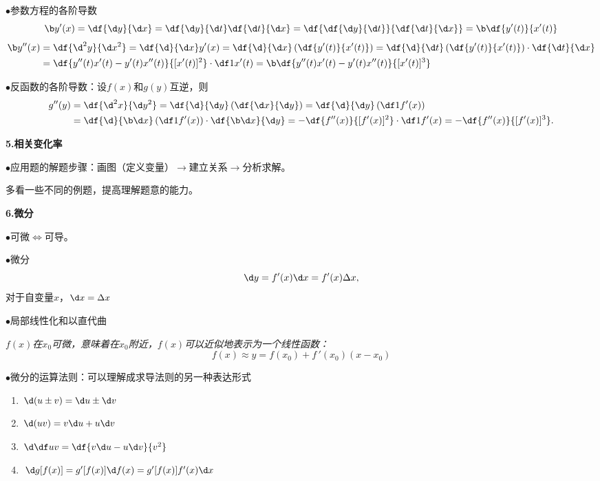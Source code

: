$\bullet$参数方程的各阶导数
$${\b y'(x)}=\df{\d y}{\d x}=\df{\d y}{\d t}\df{\d t}{\d x}
=\df{\df{\d y}{\d t}}{\df{\d t}{\d x}}={\b \df{y'(t)}{x'(t)}}$$
\begin{align*}
	{\b y''(x)}&=\df{\d^2y}{\d x^2}=\df{\d}{\d x}y'(x)
	=\df{\d}{\d x}\left(\df{y'(t)}{x'(t)}\right)
	=\df{\d}{\d t}\left(\df{y'(t)}{x'(t)}\right)\cdot\df{\d t}{\d x}\\
	&=\df{y''(t)x'(t)-y'(t)x''(t)}{[x'(t)]^2}\cdot\df1{x'(t)}
	={\b \df{y''(t)x'(t)-y'(t)x''(t)}{[x'(t)]^3}}
\end{align*}

$\bullet$反函数的各阶导数：设$f(x)$和$g(y)$互逆，则
\begin{align*}
	g''(y)&=\df{\d^2x}{\d y^2}
	=\df{\d }{\d y}\left(\df{\d x}{\d y}\right)
	=\df{\d }{\d y}\left(\df1{f'(x)}\right)\\
	&=\df{\d }{\b\d x}\left(\df1{f'(x)}\right)\cdot\df{\b\d x}{\d y}
	=-\df{f''(x)}{[f'(x)]^2}\cdot\df1{f'(x)}
	=-\df{f''(x)}{[f'(x)]^3}.
\end{align*}

{\bf 5.相关变化率}

$\bullet$应用题的解题步骤：画图（定义变量）$\to$建立关系$\to$分析求解。

多看一些不同的例题，提高理解题意的能力。

{\bf 6.微分}

$\bullet$可微$\Leftrightarrow$可导。

$\bullet$微分
$$\d y=f'(x)\d x=f'(x)\Delta x,$$
对于自变量$x$，$\d x=\Delta x$

$\bullet$局部线性化和以直代曲
\begin{center}

	\it $f(x)$在$x_0$可微，意味着在$x_0$附近，$f(x)$可以近似地表示为一个线性函数： 
	$$f(x)\approx y= f(x_0)+f\,'(x_0)(x-x_0)$$
\end{center}

$\bullet$微分的运算法则：可以理解成求导法则的另一种表达形式
\begin{enumerate}[(1)]
  \setlength{\itemindent}{1cm}
  \item $\d (u\pm v)=\d u\pm \d v$
  \item $\d(uv)=v\d u+u\d v$
  \item $\d\df uv=\df{v\d u-u\d v}{v^2}$
  \item $\d g[f(x)]=g'[f(x)]\d f(x)=g'[f(x)]f'(x)\d x$
\end{enumerate}